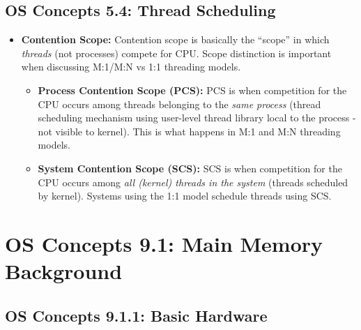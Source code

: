 \documentclass[12pt]{article}
\begin{document}
\subsection*{OS Concepts 5.4: Thread Scheduling}

\begin{itemize}
    \item \textbf{Contention Scope:} Contention scope is basically the ``scope'' in which \textit{threads} (not processes) compete for CPU. Scope distinction is important when discussing M:1/M:N vs 1:1 threading models.
        \begin{itemize}
            \item \textbf{Process Contention Scope (PCS):} PCS is when competition for the CPU occurs among threads belonging to the \textit{same process} (thread scheduling mechanism using user-level thread library local to the process - not visible to kernel). This is what happens in M:1 and M:N threading models.
            \item \textbf{System Contention Scope (SCS):} SCS is when competition for the CPU occurs among \textit{all (kernel) threads in the system} (threads scheduled by kernel). Systems using the 1:1 model schedule threads using SCS.
        \end{itemize}
\end{itemize}

\section*{OS Concepts 9.1: Main Memory Background}

\subsection*{OS Concepts 9.1.1: Basic Hardware}
\end{document}
